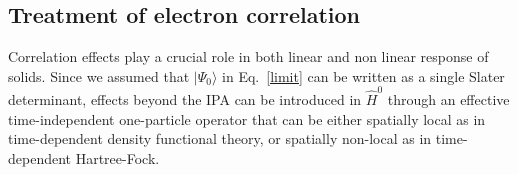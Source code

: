 \subsection{Treatment of electron correlation}\label{ss:correff}
Correlation effects play a crucial role in both linear\cite{Onida} and non linear\cite{PhysRevB.82.235201,PhysRevB.80.155205} response of solids. %
Since we assumed that $|\Psi_0\rangle$ in Eq.~\eqref{limit} can be written as a single Slater determinant, effects beyond the IPA can be introduced in $\hat H^0$ through an effective time-independent one-particle operator that can be either spatially local as in time-dependent density functional theory, or spatially non-local as in time-dependent Hartree-Fock. 

